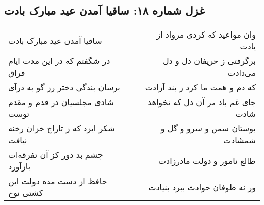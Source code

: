\begin{center}
\section*{غزل شماره ۱۸: ساقیا آمدن عید مبارک بادت}
\label{sec:sh018}
\begin{longtable}{l p{0.5cm} r}
ساقیا آمدن عید مبارک بادت
&&
وان مواعید که کردی مرواد از یادت
\\
در شگفتم که در این مدت ایام فراق
&&
برگرفتی ز حریفان دل و دل می‌دادت
\\
برسان بندگی دختر رز گو به درآی
&&
که دم و همت ما کرد ز بند آزادت
\\
شادی مجلسیان در قدم و مقدم توست
&&
جای غم باد مر آن دل که نخواهد شادت
\\
شکر ایزد که ز تاراج خزان رخنه نیافت
&&
بوستان سمن و سرو و گل و شمشادت
\\
چشم بد دور کز آن تفرقه‌ات بازآورد
&&
طالع نامور و دولت مادرزادت
\\
حافظ از دست مده دولت این کشتی نوح
&&
ور نه طوفان حوادث ببرد بنیادت
\\
\end{longtable}
\end{center}
